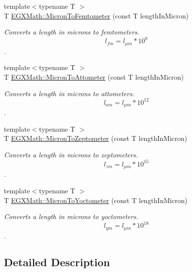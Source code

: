 \begin{DoxyCompactItemize}
{\footnotesize template$<$typename T $>$ }\\T \mbox{\hyperlink{group___e_g_x_math-_conversions-_length_conversions-_non-_s_i-_micron-_s_i_ga5e44d2763986cc07af67fdbdbe50d8fc}{E\+G\+X\+Math\+::\+Micron\+To\+Femtometer}} (const T length\+In\+Micron)
\begin{DoxyCompactList}\small\item\em Converts a length in microns to femtometers. \[ l_{fm}=l_{\mu m} * 10^{9} \]. \end{DoxyCompactList}\item 
{\footnotesize template$<$typename T $>$ }\\T \mbox{\hyperlink{group___e_g_x_math-_conversions-_length_conversions-_non-_s_i-_micron-_s_i_ga6afa3c6c25d1bbab9a96751f3a9eb1e9}{E\+G\+X\+Math\+::\+Micron\+To\+Attometer}} (const T length\+In\+Micron)
\begin{DoxyCompactList}\small\item\em Converts a length in microns to attometers. \[ l_{am}=l_{\mu m} * 10^{12} \]. \end{DoxyCompactList}\item 
{\footnotesize template$<$typename T $>$ }\\T \mbox{\hyperlink{group___e_g_x_math-_conversions-_length_conversions-_non-_s_i-_micron-_s_i_ga4b94a208fdb102d95ba62440f921875e}{E\+G\+X\+Math\+::\+Micron\+To\+Zeptometer}} (const T length\+In\+Micron)
\begin{DoxyCompactList}\small\item\em Converts a length in microns to zeptometers. \[ l_{zm}=l_{\mu m} * 10^{15} \]. \end{DoxyCompactList}\item 
{\footnotesize template$<$typename T $>$ }\\T \mbox{\hyperlink{group___e_g_x_math-_conversions-_length_conversions-_non-_s_i-_micron-_s_i_ga7a8a8c3b2da69390b326436deaffd582}{E\+G\+X\+Math\+::\+Micron\+To\+Yoctometer}} (const T length\+In\+Micron)
\begin{DoxyCompactList}\small\item\em Converts a length in microns to yoctometers. \[ l_{ym}=l_{\mu m} * 10^{18} \]. \end{DoxyCompactList}\end{DoxyCompactItemize}


\subsection{Detailed Description}


